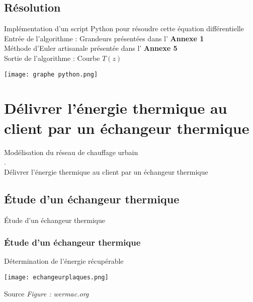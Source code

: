 \documentclass[hyperref={pdfpagelabels=false}]{beamer}
\begin{document}
\subsection*{Résolution}\label{t3}
\begin{frame}{Implémentation d'un script Python pour résoudre cette équation différentielle {\textcolor{ultramarine}{\hyperlink{a51}{}}} }
Entrée de l'algorithme : Grandeurs présentées dans l' \textbf{Annexe 1}\\
Méthode d'Euler artisanale présentée dans l' \textbf{Annexe 5}\\
Sortie de l'algorithme : Courbe $T(z)$\\


\begin{center}
\texttt{[image: graphe python.png]}
\end{center}
\end{frame}


\section{Délivrer l’énergie thermique au client par un échangeur thermique}

\begin{frame}
\begin{center}
{\huge{Modélisation du réseau de chauffage urbain}}\\
 {\color{white}.}\\
Délivrer l’énergie thermique au client par un échangeur thermique
\end{center}
\end{frame}


\subsection*{Étude d'un échangeur thermique}\label{e21}
\begin{frame}{Étude d'un échangeur thermique {\textcolor{ultramarine}{\hyperlink{a8}{}}}}
\frametitle{Étude d'un échangeur thermique}
Détermination de l'énergie récupérable\\
\begin{center}  \texttt{[image: echangeurplaques.png]}  \label{fig} \end{center} 
\hfill{\footnotesize Source \textit{Figure : wermac.org}}
\end{frame}
\end{document}

